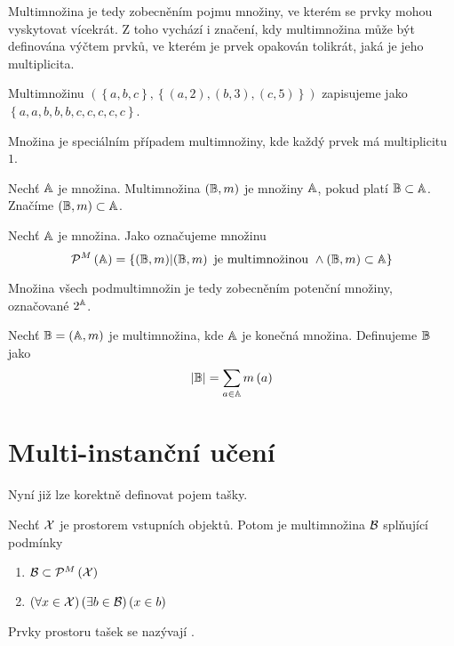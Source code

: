 Multimnožina je tedy zobecněním pojmu množiny, ve kterém se prvky mohou vyskytovat vícekrát. Z toho vychází i značení, kdy multimnožina může být definována výčtem prvků, ve kterém je prvek opakován tolikrát, jaká je jeho multiplicita.

\begin{example}
	Multimnožinu \( \left( \left\{ a, b, c \right\}, \left\{ \left( a, 2 \right), \left( b, 3 \right), \left( c, 5 \right) \right\} \right) \) zapisujeme jako \( \left\{ a, a, b, b, b, c, c, c, c, c \right\} \).
\end{example}

\begin{remark}
	Množina je speciálním případem multimnožiny, kde každý prvek má multiplicitu \( 1 \).
\end{remark}

\begin{define}
	Nechť \( \mathbb A \) je množina. Multimnožina \( \left( \mathbb B, m \right) \) je  množiny \( \mathbb A \), pokud platí \( \mathbb B \subset \mathbb A \). Značíme \( \left( \mathbb B, m \right) \subset \mathbb A \).
\end{define}

\begin{define}
	Nechť \( \mathbb A \) je množina. Jako  označujeme množinu
	\[ \mathcal P^M \left( \mathbb A \right) = \left\{ \left( \mathbb B, m \right) \middle| \left( \mathbb B, m \right) \text{ je multimnožinou } \land \left( \mathbb B, m \right) \subset \mathbb A \right\} \]
\end{define}

Množina všech podmultimnožin je tedy zobecněním potenční množiny, označované \( 2^{\mathbb A} \).

\begin{define}
	Nechť \( \mathbb B = \left( \mathbb A, m \right) \) je multimnožina, kde \( \mathbb A \) je konečná množina. Definujeme  \( \mathbb B \) jako
	\[ \left| \mathbb B \right| = \sum_{a \in \mathbb A} m \left( a \right) \]
\end{define}

\section{Multi-instanční učení}

Nyní již lze korektně definovat pojem tašky.

\begin{define}
	Nechť \( \mathcal X \) je prostorem vstupních objektů. Potom  je multimnožina \( \mathcal B \) splňující podmínky 
	\begin{enumerate}
		\item \( \mathcal B \subset \mathcal P^M \left( \mathcal X \right) \)
		\item \( \left( \forall x \in \mathcal X \right) \left( \exists b \in \mathcal B \right) \left( x \in b \right) \)
	\end{enumerate}
	Prvky prostoru tašek se nazývají .
\end{define}

